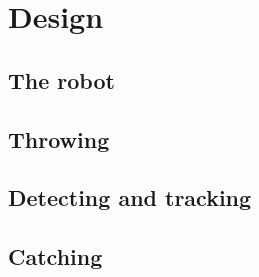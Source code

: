\chapter{Design}
\label{chap:Design}

\section{The robot}
\label{sec:The robot}

\section{Throwing}
\label{sec:ThrowingDesign}

\section{Detecting and tracking}
\label{sec:Detecting and trackingDesign}

\section{Catching}
\label{sec:catchingDesign}
